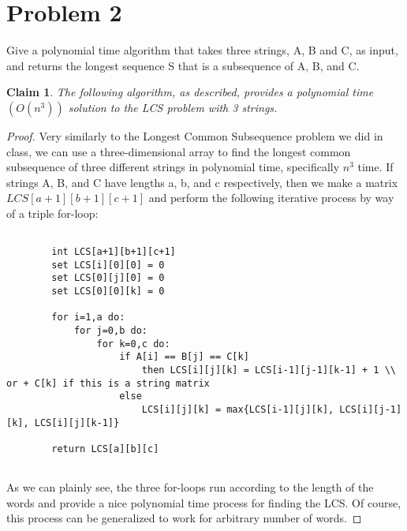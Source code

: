 \documentclass{article}
\author{Isaac B Goss\\ James Hahn\\ Jonathan Dyer}
\title{}
\date{}
\newtheorem{thm}{Claim}
\providecommand{\prob}[1]{\section*{Problem #1}}
\begin{document}
\maketitle

\prob{2}
Give a polynomial time algorithm that takes three strings, A, B and C, as input, and returns the longest sequence S that is a subsequence of A, B, and C.

\begin{thm}
The following algorithm, as described, provides a polynomial time $(O(n^3))$ solution to the LCS problem with 3 strings.
\end{thm}

\begin{proof}
    Very similarly to the Longest Common Subsequence problem we did in class, we can use a three-dimensional array to find the longest common subsequence of three different strings in polynomial time, specifically $n^3$ time. If strings A, B, and C have lengths a, b, and c respectively, then we make a matrix $LCS[a+1][b+1][c+1]$ and perform the following iterative process by way of a triple for-loop:
    
    \begin{lstlisting}

        int LCS[a+1][b+1][c+1]
        set LCS[i][0][0] = 0
        set LCS[0][j][0] = 0
        set LCS[0][0][k] = 0
        
        for i=1,a do:
            for j=0,b do:
                for k=0,c do:
                    if A[i] == B[j] == C[k]
                        then LCS[i][j][k] = LCS[i-1][j-1][k-1] + 1 \\ or + C[k] if this is a string matrix
                    else
                        LCS[i][j][k] = max{LCS[i-1][j][k], LCS[i][j-1][k], LCS[i][j][k-1]}
                    
        return LCS[a][b][c]
        
    \end{lstlisting}
    
    As we can plainly see, the three for-loops run according to the length of the words and provide a nice polynomial time process for finding the LCS. Of course, this process can be generalized to work for arbitrary number of words.

\end{proof}
\end{document}
